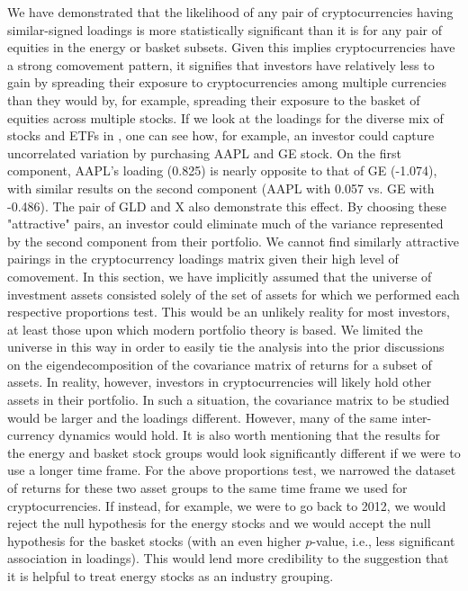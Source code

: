 \documentclass[12pt,twoside]{article}
\begin{document}
We have demonstrated that the likelihood of any pair of cryptocurrencies having similar-signed loadings is more statistically significant than it is for any pair of equities in the energy or basket subsets. Given this implies cryptocurrencies have a strong comovement pattern, it signifies that investors have relatively less to gain by spreading their exposure to cryptocurrencies among multiple currencies than they would by, for example, spreading their exposure to the basket of equities across multiple stocks. If we look at the loadings for the diverse mix of stocks and ETFs in \label{table:5}, one can see how, for example, an investor could capture uncorrelated variation by purchasing AAPL and GE stock. On the first component, AAPL's loading (0.825) is nearly opposite to that of GE (-1.074), with similar results on the second component (AAPL with 0.057 vs. GE with -0.486). The pair of GLD and X also demonstrate this effect. By choosing these "attractive" pairs, an investor could eliminate much of the variance represented by the second component from their portfolio. We cannot find similarly attractive pairings in the cryptocurrency loadings matrix given their high level of comovement.
\bigbreak
In this section, we have implicitly assumed that the universe of investment assets consisted solely of the set of assets for which we performed each respective proportions test. This would be an unlikely reality for most investors, at least those upon which modern portfolio theory is based. We limited the universe in this way in order to easily tie the analysis into the prior discussions on the eigendecomposition of the covariance matrix of returns for a subset of assets. In reality, however, investors in cryptocurrencies will likely hold other assets in their portfolio. In such a situation, the covariance matrix to be studied would be larger and the loadings different. However, many of the same inter-currency dynamics would hold. It is also worth mentioning that the results for the energy and basket stock groups would look significantly different if we were to use a longer time frame. For the above proportions test, we narrowed the dataset of returns for these two asset groups to the same time frame we used for cryptocurrencies. If instead, for example, we were to go back to 2012, we would reject the null hypothesis for the energy stocks and we would accept the null hypothesis for the basket stocks (with an even higher $p$-value, i.e., less significant association in loadings). This would lend more credibility to the suggestion that it is helpful to treat energy stocks as an industry grouping.
\end{document}
